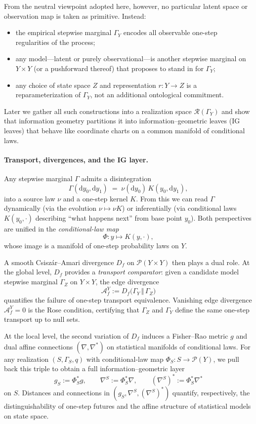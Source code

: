 \documentclass[11pt]{article}
\newcommand{\1}{\mathbf{1}}
\begin{document}
From the neutral viewpoint adopted here, however, no particular latent space or observation map is taken as primitive. Instead:
\begin{itemize}[leftmargin=1.5em]
  \item the empirical stepwise marginal $\Gamma_Y$ encodes all observable one-step regularities of the process;
  \item any model---latent or purely observational---is another stepwise marginal on $Y\times Y$ (or a pushforward thereof) that proposes to stand in for $\Gamma_Y$;
  \item any choice of state space $Z$ and representation $r:Y\to Z$ is a reparameterization of $\Gamma_Y$, not an additional ontological commitment.
\end{itemize}
Later we gather all such constructions into a realization space $\mathcal{R}(\Gamma_Y)$ and show that information geometry partitions it into information--geometric leaves (IG leaves) that behave like coordinate charts on a common manifold of conditional laws.

\paragraph{Transport, divergences, and the IG layer.}
Any stepwise marginal $\Gamma$ admits a disintegration
\[
  \Gamma(\mathrm dy_0,\mathrm dy_1)
  \;=\;
  \nu(\mathrm dy_0)\,K(y_0,\mathrm dy_1),
\]
into a source law $\nu$ and a one-step kernel $K$. From this we can read $\Gamma$ dynamically (via the evolution $\nu\mapsto\nu K$) or inferentially (via conditional laws $K(y_0,\cdot)$ describing ``what happens next'' from base point $y_0$). Both perspectives are unified in the \emph{conditional-law map}
\[
  \Phi : y \longmapsto K(y,\cdot),
\]
whose image is a manifold of one-step probability laws on $Y$.

A smooth Csiszár--Amari divergence $D_f$ on $\mathcal P(Y\times Y)$ then plays a dual role. At the global level, $D_f$ provides a \emph{transport comparator}: given a candidate model stepwise marginal $\Gamma_Z$ on $Y\times Y$, the edge divergence
\[
  \mathcal A_f^Y := D_f\bigl(\Gamma_Y \,\Vert\, \Gamma_Z\bigr)
\]
quantifies the failure of one-step transport equivalence. Vanishing edge divergence $\mathcal A_f^Y = 0$ is the Rose condition, certifying that $\Gamma_Z$ and $\Gamma_Y$ define the same one-step transport up to null sets.

At the local level, the second variation of $D_f$ induces a Fisher--Rao metric $g$ and dual affine connections $(\nabla,\nabla^\ast)$ on statistical manifolds of conditional laws. For any realization $(S,\Gamma_S,q)$ with conditional-law map $\Phi_S:S\to\mathcal P(Y)$, we pull back this triple to obtain a full information--geometric layer
\[
  g_S := \Phi_S^\ast g,
  \qquad
  \nabla^S := \Phi_S^\ast \nabla,
  \qquad
  (\nabla^S)^\ast := \Phi_S^\ast \nabla^\ast
\]
on $S$. Distances and connections in $(g_S,\nabla^S,(\nabla^S)^\ast)$ quantify, respectively, the distinguishability of one-step futures and the affine structure of statistical models on state space.
\end{document}
